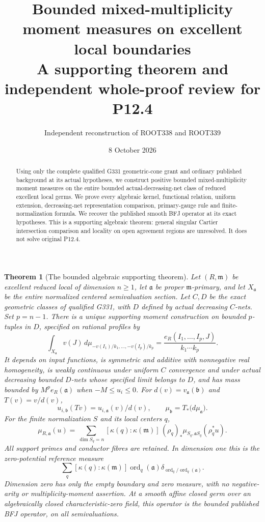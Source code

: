 \documentclass[11pt]{article}
\title{Bounded mixed-multiplicity moment measures on excellent local boundaries\\
A supporting theorem and independent whole-proof review for P12.4}
\author{Independent reconstruction of ROOT338 and ROOT339}
\date{8 October 2026}
\newtheorem{theorem}{Theorem}
\begin{document}
\maketitle
\begin{abstract}
Using only the complete qualified G331 geometric-cone grant and ordinary
published background at its actual hypotheses, we construct positive bounded
mixed-multiplicity moment measures on the entire bounded actual-decreasing-net
class of reduced excellent local germs. We prove every algebraic kernel,
functional relation, uniform extension, decreasing-net representation comparison,
primary-gauge rule and finite-normalization formula. We recover the published
smooth BFJ operator at its exact hypotheses. This is a supporting algebraic
theorem: general singular Cartier intersection comparison and locality on open
agreement regions are unresolved. It does not solve original P12.4.
\end{abstract}
\begin{theorem}[The bounded algebraic supporting theorem]
Let $(R,\mathfrak m)$ be excellent reduced local of dimension $n\ge1$,
let $\mathfrak a$ be proper $\mathfrak m$-primary, and let $X_{\mathfrak a}$
be the entire normalized centered semivaluation section. Let $C,D$ be the
exact geometric classes of qualified G331, with $D$ defined by actual
decreasing $C$-nets. Set $p=n-1$. There is a unique supporting moment
construction on bounded $p$-tuples in $D$, specified on rational profiles by
\[
 \int_{X_{\mathfrak a}}v(J)\,d\mu_{-v(I_1)/k_1,\ldots,-v(I_p)/k_p}
 =\frac{e_R(I_1,\ldots,I_p,J)}{k_1\cdots k_p}.
\]
It depends on input functions, is symmetric and additive with nonnegative
real homogeneity, is weakly continuous under uniform $C$ convergence and
under actual decreasing bounded $D$-nets whose specified limit belongs to
$D$, and has mass bounded by $M^p e_R(\mathfrak a)$ when
$-M\le u_i\le0$. For $d(v)=v_{\mathfrak a}(\mathfrak b)$ and
$T(v)=v/d(v)$,
\[
 u_{i,\mathfrak b}(Tv)=u_{i,\mathfrak a}(v)/d(v),\qquad
 \mu_{\mathfrak b}=T_*\bigl(d\mu_{\mathfrak a}\bigr).
\]
For the finite normalization $S$ and its local centers $q$,
\[
 \mu_{R,\mathfrak a}(u)=
 \sum_{\dim S_q=n}[\kappa(q):\kappa(\mathfrak m)]\,
 (\rho_q)_*\mu_{S_q,\mathfrak aS_q}(\rho_q^*u).
\]
All support primes and conductor fibres are retained. In dimension one
this is the zero-potential reference measure
\[
 \sum_q[\kappa(q):\kappa(\mathfrak m)]\operatorname{ord}_q(\mathfrak a)
 \delta_{\operatorname{ord}_q/\operatorname{ord}_q(\mathfrak a)}.
\]
Dimension zero has only the empty boundary and zero measure, with no
negative-arity or multiplicity-moment assertion. At a smooth affine closed
germ over an algebraically closed characteristic-zero field, this operator
is the bounded published BFJ operator, on all semivaluations.
\end{theorem}
\end{document}
